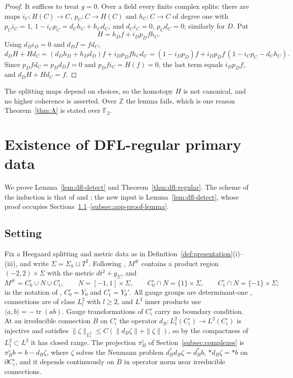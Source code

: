 \documentclass[11pt]{amsart}
\theoremstyle{definition}
\theoremstyle{remark}
\theoremstyle{plain}
\numberwithin{equation}{section}
\newcommand{\ZZ}{\mathbb{Z}}
\newcommand{\FF}{\mathbb{F}_2}
\newcommand{\tr}{\operatorname{tr}}
\begin{document}
\begin{proof}
It suffices to treat $g=0$. Over a field every finite complex splits: there
are maps $i_C\colon H(C)\to C$, $p_C\colon C\to H(C)$ and
$h_C\colon C\to C$ of degree one with $p_Ci_C=1$,
$1-i_Cp_C=d_Ch_C+h_Cd_C$, and $d_Ci_C=0$, $p_Cd_C=0$; similarly for $D$.
Put
\[
H=h_Df+i_Dp_Dfh_C .
\]
Using $d_Di_D=0$ and $d_Df=fd_C$,
\[
d_DH+Hd_C=(d_Dh_D+h_Dd_D)f+i_Dp_Dfh_Cd_C
=(1-i_Dp_D)f+i_Dp_Df\,(1-i_Cp_C-d_Ch_C).
\]
Since $p_Dfd_C=p_Dd_Df=0$ and $p_Dfi_C=H(f)=0$, the last term equals
$i_Dp_Df$, and $d_DH+Hd_C=f$.
\end{proof}

The splitting maps depend on choices, so the homotopy $H$ is not
canonical, and no higher coherence is asserted. Over $\ZZ$ the lemma
fails, which is one reason Theorem~\ref{thm:A} is stated over $\FF$.

\section{Existence of DFL-regular primary data}\label{app:dfl-regular}

We prove Lemma~\ref{lem:dfl-detect} and Theorem~\ref{thm:dfl-regular}. The scheme of the
induction is that of \cite[proof of Proposition~6.8]{DFL} and
\cite[Section~5.5.1]{Donaldson-book}; the new input is Lemma~\ref{lem:dfl-detect}, whose proof
occupies Sections~\ref{subsec:app-setting}--\ref{subsec:app-proof-lemma}.

\subsection{Setting}\label{subsec:app-setting}

Fix a Heegaard splitting and metric data as in Definition~\ref{def:presentation}(i)--(iii),
and write $\Sigma=\Sigma_h\sqcup T^2$. Following \cite[Section~2.1, (2.1)]{DFL}, $M^\#$
contains a product region $(-2,2)\times\Sigma$ with the metric $dt^2+g_\Sigma$, and
\[
M^\#=C_0^\circ\cup N\cup C_1^\circ,\qquad N=[-1,1]\times\Sigma,\qquad
C_0^\circ\cap N=\{1\}\times\Sigma,\qquad C_1^\circ\cap N=\{-1\}\times\Sigma ;
\]
in the notation of \cite{DFL}, $C_0^\circ=Y_0$ and $C_1^\circ=Y_0'$. All gauge groups are
determinant-one \cite[Section~2.2]{DFL}, connections are of class $L^2_l$ with $l\ge2$, and
$L^2$ inner products use $\langle a,b\rangle=-\tr(ab)$. Gauge transformations of $C_i^\circ$ carry
no boundary condition. At an irreducible connection $B$ on $C_i^\circ$ the operator
$d_B\colon L^2_1(C_i^\circ)\to L^2(C_i^\circ)$ is injective and satisfies
$\|\zeta\|_{L^2_1}\le C(\|d_B\zeta\|+\|\zeta\|)$, so by the compactness of $L^2_1\subset L^2$ it
has closed range. The projection $\pi^i_B$ of Section~\ref{subsec:complexes} is
$\pi^i_Bb=b-d_B\zeta$, where $\zeta$ solves the Neumann problem $d_B^*d_B\zeta=d_B^*b$,
$*d_B\zeta=*b$ on $\partial C_i^\circ$, and it depends continuously on $B$ in operator norm near
irreducible connections.
\end{document}
